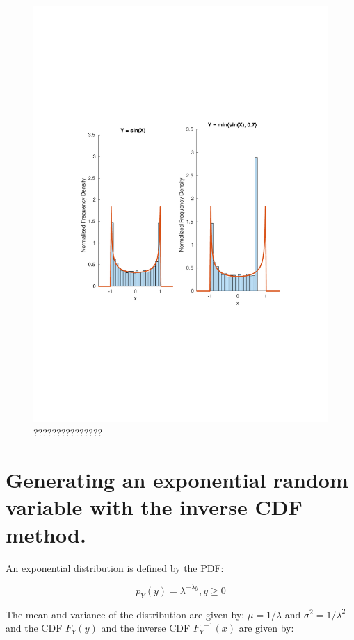 \documentclass[12pt]{article}
\begin{document}
\begin{figure}[!htb]
\includegraphics[width=\textwidth]{figures/uniform-sine-transform.pdf}
  \caption{???????????????}
  \label{fig:sine-function}
\end{figure}

\section{Generating an exponential random variable with the inverse CDF method.}

An exponential distribution is defined by the PDF:

\begin{equation}
  p_Y(y)  = \lambda  ^ {- \lambda y}, y \ge 0	
\end{equation}

The mean and variance of the distribution are given by: $\mu = 1 / \lambda$ and $\sigma ^ 2 = 1 / \lambda ^ 2$ and the CDF $F_Y(y)$ and the inverse CDF ${F_Y}^{-1}(x)$ are given by:
\end{document}
